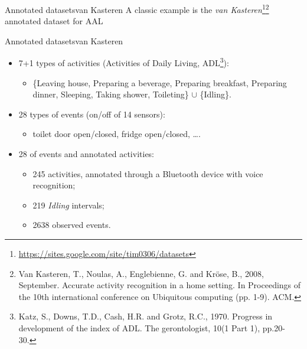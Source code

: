 \documentclass[9pt, handout]{beamer}
\begin{document}
      \begin{frame}{Annotated datasets}{van Kasteren}
        A classic example is the \textit{van Kasteren}\footnote{\url{https://sites.google.com/site/tim0306/datasets}}\footnote{Van Kasteren, T., Noulas, A., Englebienne, G. and Kröse, B., 2008, September. Accurate activity recognition in a home setting. In Proceedings of the 10th international conference on Ubiquitous computing (pp. 1-9). ACM.} annotated dataset for AAL
        
        \pause
      \end{frame}
      
      \begin{frame}{Annotated datasets}{van Kasteren}
        \pause
        \begin{itemize}
          \item 7+1 types of activities (Activities of Daily Living, ADL\footnote{Katz, S., Downs, T.D., Cash, H.R. and Grotz, R.C., 1970. Progress in development of the index of ADL. The gerontologist, 10(1 Part 1), pp.20-30.}):
          \begin{itemize}
            \item \{Leaving house, Preparing a beverage, Preparing breakfast, Preparing dinner, Sleeping, Taking shower, Toileting\} $\cup$ \{Idling\}.
          \end{itemize}
          \pause
          \item 28 types of events (on/off of 14 sensors):
          \begin{itemize}
            \item toilet door open/closed, fridge open/closed, \dots.
          \end{itemize}
          \pause
          \item 28 of events and annotated activities:
          \begin{itemize}
            \item 245 activities, annotated through a Bluetooth device with voice recognition;
            \item 219 \textit{Idling} intervals;
            \item 2638 observed events.
          \end{itemize}
        \end{itemize}
      \end{frame}
      
\end{document}
